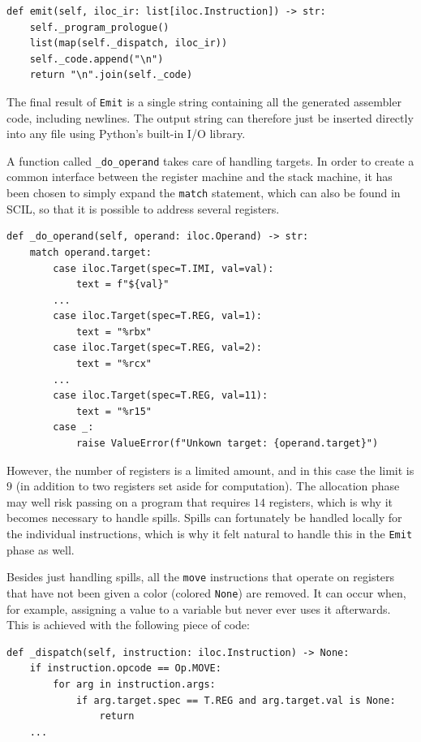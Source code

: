\begin{verbatim}
def emit(self, iloc_ir: list[iloc.Instruction]) -> str:
    self._program_prologue()
    list(map(self._dispatch, iloc_ir))
    self._code.append("\n")
    return "\n".join(self._code)
\end{verbatim}

The final result of \texttt{Emit} is a single string containing all the generated assembler code, including newlines. The output string can therefore just be inserted directly into any file using Python's built-in I/O library.

A function called \texttt{\_do\_operand} takes care of handling targets. In order to create a common interface between the register machine and the stack machine, it has been chosen to simply expand the \texttt{match} statement, which can also be found in SCIL, so that it is possible to address several registers.

\begin{verbatim}
def _do_operand(self, operand: iloc.Operand) -> str:
    match operand.target:
        case iloc.Target(spec=T.IMI, val=val):
            text = f"${val}"
        ...
        case iloc.Target(spec=T.REG, val=1):
            text = "%rbx"
        case iloc.Target(spec=T.REG, val=2):
            text = "%rcx"
        ...
        case iloc.Target(spec=T.REG, val=11):
            text = "%r15"
        case _:
            raise ValueError(f"Unkown target: {operand.target}")
\end{verbatim}

However, the number of registers is a limited amount, and in this case the limit is $9$ (in addition to two registers set aside for computation). The allocation phase may well risk passing on a program that requires $14$ registers, which is why it becomes necessary to handle spills. Spills can fortunately be handled locally for the individual instructions, which is why it felt natural to handle this in the \texttt{Emit} phase as well.

Besides just handling spills, all the \texttt{move} instructions that operate on registers that have not been given a color (colored \texttt{None}) are removed. It can occur when, for example, assigning a value to a variable but never ever uses it afterwards. This is achieved with the following piece of code:

\begin{verbatim}
def _dispatch(self, instruction: iloc.Instruction) -> None:
    if instruction.opcode == Op.MOVE:
        for arg in instruction.args:
            if arg.target.spec == T.REG and arg.target.val is None:
                return
    ...
\end{verbatim}


